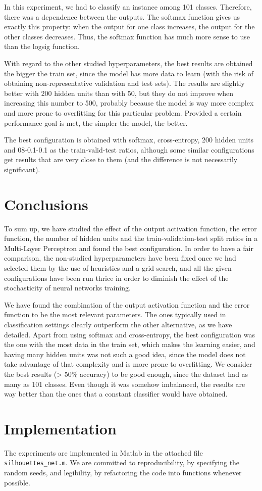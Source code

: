 \documentclass{article}[11pt]
\begin{document}
In this experiment, we had to classify an instance among 101 classes. Therefore, there was a dependence between the outputs. The softmax function gives us exactly this property: when the output for one class increases, the output for the other classes decreases. Thus, the softmax function has much more sense to use than the logsig function.
    
With regard to the other studied hyperparameters, the best results are obtained the bigger the train set, since the model has more data to learn (with the risk of obtaining non-representative validation and test sets). The results are slightly better with 200 hidden units than with 50, but they do not improve when increasing this number to 500, probably because the model is way more complex and more prone to overfitting for this particular problem. Provided a certain performance goal is met, the simpler the model, the better.

The best configuration is obtained with softmax, cross-entropy, 200 hidden units and 08-0.1-0.1 as the train-valid-test ratios, although some similar configurations get results that are very close to them (and the difference is not necessarily significant).
\section{Conclusions}

To sum up, we have studied the effect of the output activation function, the error function, the number of hidden units and the train-validation-test split ratios in a Multi-Layer Perceptron and found the best configuration. In order to have a fair comparison, the non-studied hyperparameters have been fixed once we had selected them by the use of heuristics and a grid search, and all the given configurations have been run thrice in order to diminish the effect of the stochasticity of neural networks training.

We have found the combination of the output activation function and the error function to be the most relevant parameters. The ones typically used in classification settings clearly outperform the other alternative, as we have detailed. Apart from using softmax and cross-entropy, the best configuration was the one with the most data in the train set, which makes the learning easier, and having many hidden units was not such a good idea, since the model does not take advantage of that complexity and is more prone to overfitting. We consider the best results (> 50\% accuracy) to be good enough, since the dataset had as many as 101 classes. Even though it was somehow imbalanced, the results are way better than the ones that a constant classifier would have obtained.
\section{Implementation}
The experiments are implemented in Matlab in the attached file \texttt{silhouettes\_net.m}. We are committed to reproducibility, by specifying the random seeds, and legibility, by refactoring the code into functions whenever possible.
\end{document}
